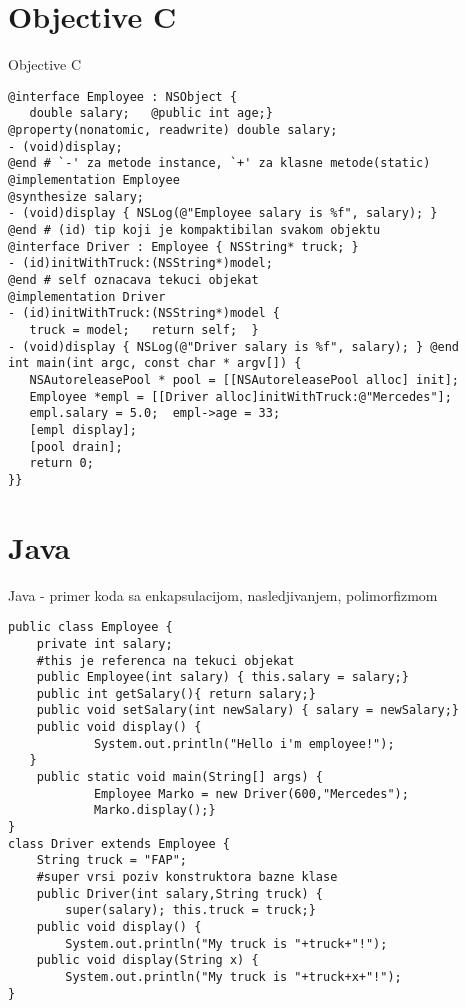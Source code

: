 \documentclass[14pt,aspectratio=169]{beamer}
\begin{document}
\section{Objective C}
\begin{frame}[fragile]{Objective C}
\begin{lstlisting}[caption={Primer koda u Objective C jeziku},frame=single, label=ObjectiveC]
@interface Employee : NSObject {
   double salary;	@public int age;}
@property(nonatomic, readwrite) double salary; 
- (void)display;
@end # `-' za metode instance, `+' za klasne metode(static)
@implementation Employee
@synthesize salary; 
- (void)display { NSLog(@"Employee salary is %f", salary); }
@end # (id) tip koji je kompaktibilan svakom objektu
@interface Driver : Employee { NSString* truck; }
- (id)initWithTruck:(NSString*)model;
@end # self oznacava tekuci objekat
@implementation Driver
- (id)initWithTruck:(NSString*)model {
   truck = model;	return self;  }
- (void)display { NSLog(@"Driver salary is %f", salary); } @end
int main(int argc, const char * argv[]) {
   NSAutoreleasePool * pool = [[NSAutoreleasePool alloc] init];
   Employee *empl = [[Driver alloc]initWithTruck:@"Mercedes"];
   empl.salary = 5.0;  empl->age = 33;
   [empl display];
   [pool drain];
   return 0;
}}
\end{lstlisting}
\end{frame}

\section{Java}
\begin{frame}[fragile]{Java \small{- primer koda sa enkapsulacijom, nasledjivanjem, polimorfizmom} }
\begin{lstlisting}
public class Employee {
	private int salary;
	#this je referenca na tekuci objekat
	public Employee(int salary) { this.salary = salary;}
 	public int getSalary(){ return salary;}
	public void setSalary(int newSalary) { salary = newSalary;}
	public void display() {
     		System.out.println("Hello i'm employee!");
   }
	public static void main(String[] args) {
    		Employee Marko = new Driver(600,"Mercedes");
    		Marko.display();}    
}
class Driver extends Employee {
  	String truck = "FAP";
	#super vrsi poziv konstruktora bazne klase
   	public Driver(int salary,String truck) {
		super(salary); this.truck = truck;}
  	public void display() {
		System.out.println("My truck is "+truck+"!");
	public void display(String x) {
		System.out.println("My truck is "+truck+x+"!");
}
\end{lstlisting}
\end{frame}
\end{document}
